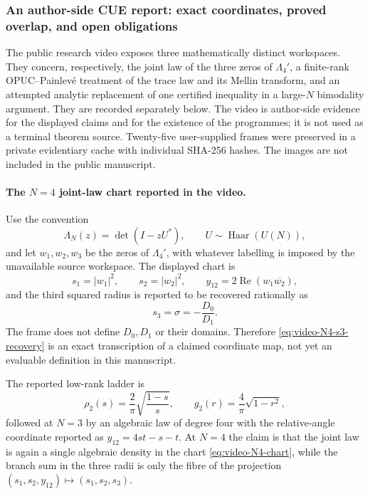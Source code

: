 \subsubsection{An author-side CUE report: exact coordinates, proved overlap, and open obligations}
\label{sec:easy-riders-fable51-audit}

The public research video \cite{easyRiders2026Fable51} exposes three mathematically
distinct workspaces.  They concern, respectively, the joint law of the three zeros of
$\Lambda_4'$, a finite-rank OPUC--Painlev\'e treatment of the trace law and its Mellin
transform, and an attempted analytic replacement of one certified inequality in a
large-$N$ bimodality argument.  They are recorded separately below.  The video is
author-side evidence for the displayed claims and for the existence of the programmes;
it is not used as a terminal theorem source.  Twenty-five user-supplied frames were
preserved in a private evidentiary cache with individual SHA-256 hashes.  The images are
not included in the public manuscript.

\paragraph{The $N=4$ joint-law chart reported in the video.}
Use the convention
\[
 \Lambda_N(z)=\det(I-zU^*),\qquad U\sim\operatorname{Haar}(U(N)),
\]
and let $w_1,w_2,w_3$ be the zeros of $\Lambda_4'$, with whatever labelling is imposed
by the unavailable source workspace.  The displayed chart is
\begin{equation}
 s_1=|w_1|^2,\qquad s_2=|w_2|^2,
 \qquad y_{12}=2\operatorname{Re}(w_1\overline{w_2}),
 \label{eq:video-N4-chart}
\end{equation}
and the third squared radius is reported to be recovered rationally as
\begin{equation}
 s_3=\sigma=-\frac{D_0}{D_1}.
 \label{eq:video-N4-s3-recovery}
\end{equation}
The frame does not define $D_0,D_1$ or their domains.  Therefore
\eqref{eq:video-N4-s3-recovery} is an exact transcription of a claimed coordinate map,
not yet an evaluable definition in this manuscript.

The reported low-rank ladder is
\[
 \rho_2(s)=\frac{2}{\pi}\sqrt{\frac{1-s}{s}},\qquad
 g_2(r)=\frac{4}{\pi}\sqrt{1-r^2},
\]
followed at $N=3$ by an algebraic law of degree four with the relative-angle coordinate
reported as $y_{12}=4st-s-t$.  At $N=4$ the claim is that the joint law is again a
single algebraic density in the chart \eqref{eq:video-N4-chart}, while the branch sum in
the three radii is only the fibre of the projection
$(s_1,s_2,y_{12})\mapsto(s_1,s_2,s_3)$.

